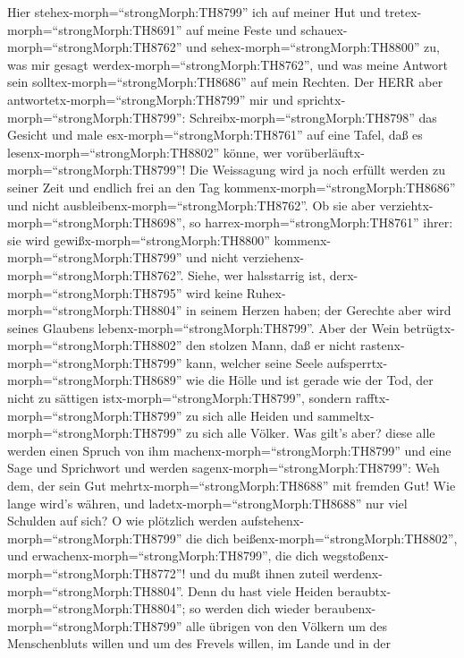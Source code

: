  Hier stehex-morph=``strongMorph:TH8799'' ich auf meiner Hut
und tretex-morph=``strongMorph:TH8691'' auf meine Feste und
schauex-morph=``strongMorph:TH8762'' und
sehex-morph=``strongMorph:TH8800'' zu, was mir gesagt
werdex-morph=``strongMorph:TH8762'', und was meine Antwort sein
solltex-morph=``strongMorph:TH8686'' auf mein Rechten.  Der
HERR aber antwortetx-morph=``strongMorph:TH8799'' mir und
sprichtx-morph=``strongMorph:TH8799'':
Schreibx-morph=``strongMorph:TH8798'' das Gesicht und male
esx-morph=``strongMorph:TH8761'' auf eine Tafel, daß es
lesenx-morph=``strongMorph:TH8802'' könne, wer
vorüberläuftx-morph=``strongMorph:TH8799''!  Die Weissagung
wird ja noch erfüllt werden zu seiner Zeit und endlich frei an den Tag
kommenx-morph=``strongMorph:TH8686'' und nicht
ausbleibenx-morph=``strongMorph:TH8762''. Ob sie aber
verziehtx-morph=``strongMorph:TH8698'', so
harrex-morph=``strongMorph:TH8761'' ihrer: sie wird
gewißx-morph=``strongMorph:TH8800'' kommenx-morph=``strongMorph:TH8799''
und nicht verziehenx-morph=``strongMorph:TH8762''.  Siehe,
wer halsstarrig ist, derx-morph=``strongMorph:TH8795'' wird keine
Ruhex-morph=``strongMorph:TH8804'' in seinem Herzen haben; der Gerechte
aber wird seines Glaubens lebenx-morph=``strongMorph:TH8799''.
 Aber der Wein betrügtx-morph=``strongMorph:TH8802'' den
stolzen Mann, daß er nicht rastenx-morph=``strongMorph:TH8799'' kann,
welcher seine Seele aufsperrtx-morph=``strongMorph:TH8689'' wie die
Hölle und ist gerade wie der Tod, der nicht zu sättigen
istx-morph=``strongMorph:TH8799'', sondern
rafftx-morph=``strongMorph:TH8799'' zu sich alle Heiden und
sammeltx-morph=``strongMorph:TH8799'' zu sich alle Völker. 
Was gilt's aber? diese alle werden einen Spruch von ihm
machenx-morph=``strongMorph:TH8799'' und eine Sage und Sprichwort und
werden sagenx-morph=``strongMorph:TH8799'': Weh dem, der sein Gut
mehrtx-morph=``strongMorph:TH8688'' mit fremden Gut! Wie lange wird's
währen, und ladetx-morph=``strongMorph:TH8688'' nur viel Schulden auf
sich?  O wie plötzlich werden
aufstehenx-morph=``strongMorph:TH8799'' die dich
beißenx-morph=``strongMorph:TH8802'', und
erwachenx-morph=``strongMorph:TH8799'', die dich
wegstoßenx-morph=``strongMorph:TH8772''! und du mußt ihnen zuteil
werdenx-morph=``strongMorph:TH8804''.  Denn du hast viele
Heiden beraubtx-morph=``strongMorph:TH8804''; so werden dich wieder
beraubenx-morph=``strongMorph:TH8799'' alle übrigen von den Völkern um
des Menschenbluts willen und um des Frevels willen, im Lande und in der

